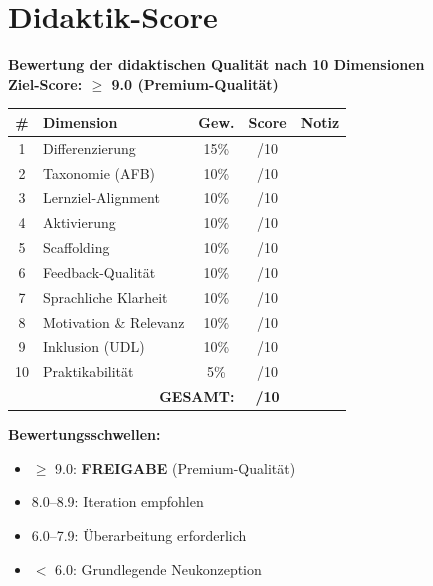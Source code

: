 \documentclass[11pt,a4paper]{article}
\begin{document}
\newpage
\section{Didaktik-Score}

\begin{scorebox}
\textbf{Bewertung der didaktischen Qualität nach 10 Dimensionen}\\
\textbf{Ziel-Score: $\geq$ 9.0 (Premium-Qualität)}

\vspace{1em}
\begin{tabular}{|c|l|c|c|p{4.5cm}|}
\hline
\textbf{\#} & \textbf{Dimension} & \textbf{Gew.} & \textbf{Score} & \textbf{Notiz} \\
\hline
1 & Differenzierung & 15\% & /10 & \\
\hline
2 & Taxonomie (AFB) & 10\% & /10 & \\
\hline
3 & Lernziel-Alignment & 10\% & /10 & \\
\hline
4 & Aktivierung & 10\% & /10 & \\
\hline
5 & Scaffolding & 10\% & /10 & \\
\hline
6 & Feedback-Qualität & 10\% & /10 & \\
\hline
7 & Sprachliche Klarheit & 10\% & /10 & \\
\hline
8 & Motivation \& Relevanz & 10\% & /10 & \\
\hline
9 & Inklusion (UDL) & 10\% & /10 & \\
\hline
10 & Praktikabilität & 5\% & /10 & \\
\hline
\multicolumn{3}{|r|}{\textbf{GESAMT:}} & \textbf{/10} & \\
\hline
\end{tabular}

\vspace{1em}
\textbf{Bewertungsschwellen:}
\begin{itemize}
    \item[$\Box$] \textcolor{successgreen}{$\geq$ 9.0: \textbf{FREIGABE} (Premium-Qualität)}
    \item[$\Box$] \textcolor{warningorange}{8.0--8.9: Iteration empfohlen}
    \item[$\Box$] 6.0--7.9: Überarbeitung erforderlich
    \item[$\Box$] $<$ 6.0: Grundlegende Neukonzeption
\end{itemize}
\end{scorebox}
\end{document}
